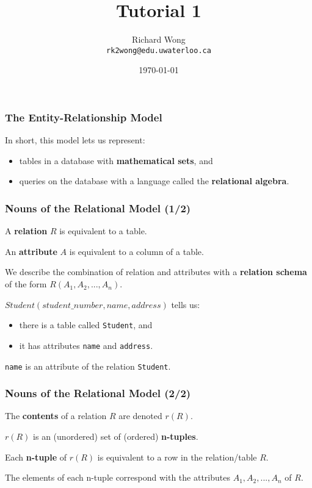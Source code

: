 

\title{Tutorial 1}

\author{Richard Wong \\ \small \texttt{rk2wong@edu.uwaterloo.ca}}
\date{\today}




\begin{frame}
  \titlepage

\end{frame}

\begin{frame}
\frametitle{The Entity-Relationship Model}

In short, this model lets us represent:\\
\begin{itemize}
\item tables in a database with \textbf{mathematical sets}, and
\item queries on the database with a language called the \textbf{relational algebra}.
\end{itemize}

\end{frame}


\begin{frame}
\frametitle{Nouns of the Relational Model (1/2)}

A \textbf{relation} $R$ is equivalent to a table.

An \textbf{attribute} $A$ is equivalent to a column of a table.

We describe the combination of relation and attributes with a \textbf{relation schema} of the form $R(A_1, A_2, ... , A_n)$.

$Student(student\_number, name, address)$ tells us:\\
\begin{itemize}
\item there is a table called \texttt{Student}, and
\item it has attributes \texttt{name} and \texttt{address}.
\end{itemize}

\texttt{name} is an attribute of the relation \texttt{Student}.

\end{frame}

\begin{frame}
\frametitle{Nouns of the Relational Model (2/2)}

The \textbf{contents} of a relation $R$ are denoted $r(R)$.

$r(R)$ is an (unordered) set of (ordered) \textbf{n-tuples}.

Each \textbf{n-tuple} of $r(R)$ is equivalent to a row in the relation/table $R$.

The elements of each n-tuple correspond with the attributes $A_1, A_2, ... , A_n$ of $R$.

\end{frame}

